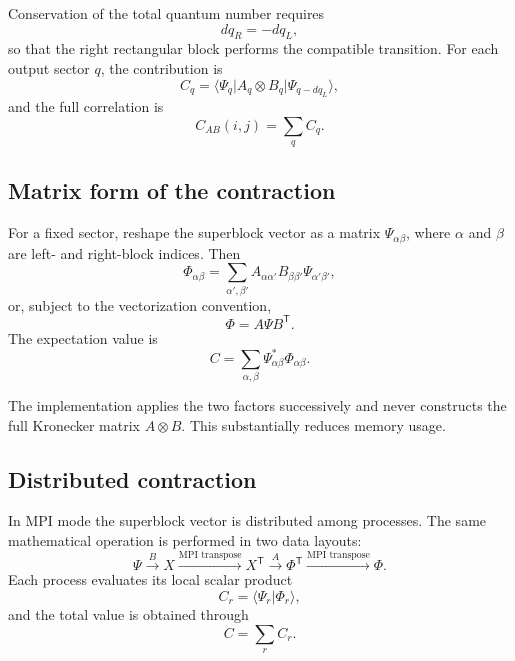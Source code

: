 \documentclass[11pt,a4paper]{article}
\newcommand{\ket}[1]{\lvert #1\rangle}
\newcommand{\bra}[1]{\langle #1\rvert}
\begin{document}
Conservation of the total quantum number requires
\begin{equation}
  dq_R=-dq_L,
\end{equation}
so that the right rectangular block performs the compatible transition.
For each output sector $q$, the contribution is
\begin{equation}
  C_q
  =\bra{\Psi_q}A_q\otimes B_q\ket{\Psi_{q-dq_L}},
\end{equation}
and the full correlation is
\begin{equation}
  C_{AB}(i,j)=\sum_q C_q.
\end{equation}

\subsection{Matrix form of the contraction}

For a fixed sector, reshape the superblock vector as a matrix
$\Psi_{\alpha\beta}$, where $\alpha$ and $\beta$ are left- and right-block
indices.  Then
\begin{equation}
  \Phi_{\alpha\beta}
  =\sum_{\alpha',\beta'}
   A_{\alpha\alpha'}B_{\beta\beta'}
   \Psi_{\alpha'\beta'},
\end{equation}
or, subject to the vectorization convention,
\begin{equation}
  \Phi=A\Psi B^{\mathsf T}.
\end{equation}
The expectation value is
\begin{equation}
  C=\sum_{\alpha,\beta}
  \Psi_{\alpha\beta}^*\Phi_{\alpha\beta}.
\end{equation}

The implementation applies the two factors successively and never constructs
the full Kronecker matrix $A\otimes B$.  This substantially reduces memory
usage.

\subsection{Distributed contraction}

In MPI mode the superblock vector is distributed among processes.  The same
mathematical operation is performed in two data layouts:
\begin{equation}
  \Psi
  \xrightarrow{B}X
  \xrightarrow{\text{MPI transpose}}X^{\mathsf T}
  \xrightarrow{A}\Phi^{\mathsf T}
  \xrightarrow{\text{MPI transpose}}\Phi.
\end{equation}
Each process evaluates its local scalar product
\begin{equation}
  C_r=\bra{\Psi_r}\Phi_r\rangle,
\end{equation}
and the total value is obtained through
\begin{equation}
  C=\sum_r C_r.
\end{equation}
\end{document}
